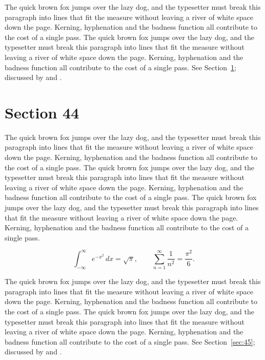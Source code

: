 \documentclass{article}
\begin{document}
The quick brown fox jumps over the lazy dog, and the typesetter must break this paragraph into lines that fit the measure without leaving a river of white space down the page. Kerning, hyphenation and the badness function all contribute to the cost of a single pass. The quick brown fox jumps over the lazy dog, and the typesetter must break this paragraph into lines that fit the measure without leaving a river of white space down the page. Kerning, hyphenation and the badness function all contribute to the cost of a single pass. 
See Section~\ref{sec:44}; discussed by \textcite{k4} and \textcite{l1}.
\section{Section 44}
\label{sec:44}
The quick brown fox jumps over the lazy dog, and the typesetter must break this paragraph into lines that fit the measure without leaving a river of white space down the page. Kerning, hyphenation and the badness function all contribute to the cost of a single pass. The quick brown fox jumps over the lazy dog, and the typesetter must break this paragraph into lines that fit the measure without leaving a river of white space down the page. Kerning, hyphenation and the badness function all contribute to the cost of a single pass. The quick brown fox jumps over the lazy dog, and the typesetter must break this paragraph into lines that fit the measure without leaving a river of white space down the page. Kerning, hyphenation and the badness function all contribute to the cost of a single pass. 

\begin{equation}\label{eq:44}
\int_{-\infty}^{\infty} e^{-x^{2}}\,dx = \sqrt{\pi}, \qquad
\sum_{n=1}^{\infty} \frac{1}{n^{2}} = \frac{\pi^{2}}{6}.
\end{equation}

The quick brown fox jumps over the lazy dog, and the typesetter must break this paragraph into lines that fit the measure without leaving a river of white space down the page. Kerning, hyphenation and the badness function all contribute to the cost of a single pass. The quick brown fox jumps over the lazy dog, and the typesetter must break this paragraph into lines that fit the measure without leaving a river of white space down the page. Kerning, hyphenation and the badness function all contribute to the cost of a single pass. 
See Section~\ref{sec:45}; discussed by \textcite{k5} and \textcite{l2}.
\end{document}
